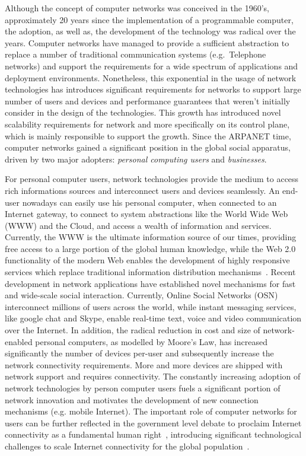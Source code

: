 Although the concept of computer networks was conceived in the 1960's,
approximately 20 years since the implementation of a programmable computer, the
adoption, as well as, the development of the technology was radical over the
years. Computer networks have managed to provide a sufficient abstraction to
replace a number of traditional communication systems (e.g.~Telephone networks)
and support the requirements for a wide spectrum of applications and deployment
environments. Nonetheless, this exponential in the usage of network technologies
has introduces significant requirements for networks to support large number of
users and devices and performance guarantees that weren't initially consider in
the design of the technologies. This growth has introduced novel scalability
requirements for network and more specifically on its control plane, which is
mainly responsible to support the growth. 
Since the ARPANET time, computer networks gained a significant
position in the global social apparatus, driven by two major adopters: {\it personal
  computing users} and {\it businesses}.

For personal computer users, network technologies provide the medium to access
rich informations sources and interconnect users and devices seamlessly. An
end-user nowadays can easily use his personal computer, when connected to an
Internet gateway, to connect to system abstractions like the World Wide Web (WWW)
and the Cloud, and access a wealth of information and services.  Currently,
the WWW is the ultimate information source of our times, providing free access
to a large portion of the global human knowledge, while the Web 2.0
functionality of the modern Web enables the development of highly responsive
services which replace traditional information distribution
mechanisms~\cite{stempel2000}.  Recent development in network applications have
established novel mechanisms for fast and wide-scale social interaction.
Currently, Online Social Networks (OSN) interconnect millions of users across
the world, while instant messaging services, like google chat and Skype, enable
real-time text, voice and video communication over the Internet.  In addition,
the radical reduction in cost and size of network-enabled personal computers, as
modelled by Moore's Law, has increased significantly the number of devices
per-user and subsequently increase the network connectivity requirements.  More
and more devices are shipped with network support and 
requires connectivity. The constantly increasing adoption of network
technologies by person computer users fuels a significant portion of network
innovation and motivates the development of new connection mechanisms (e.g.
mobile Internet).  The important role of computer networks for users can be
further reflected in the government level debate to proclaim Internet
connectivity as a fundamental human right~\cite{klang2005human, Wicker2013},
introducing significant technological challenges to scale Internet connectivity
for the global population~\cite{cerf2012}.

